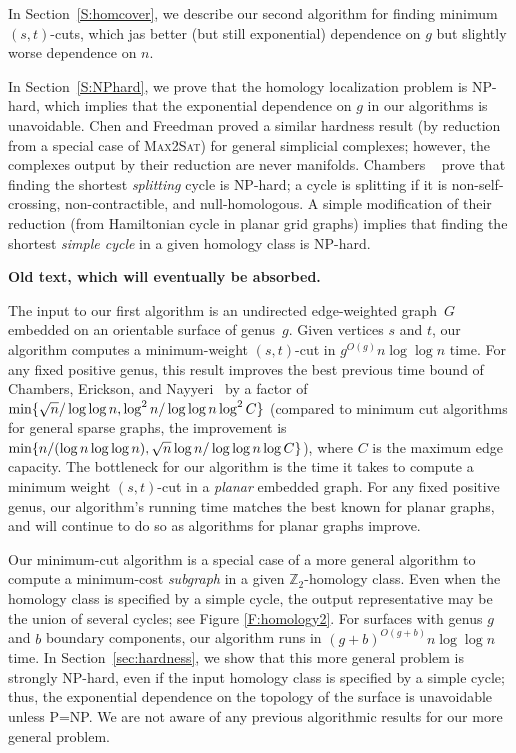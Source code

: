 \documentclass[11pt,twoside]{article}
\def\Z{\mathbb{Z}}
\begin{document}
In Section~\ref{S:homcover}, we describe our second algorithm for finding minimum $(s,t)$-cuts, which jas  better (but still exponential) dependence on $g$ but slightly worse dependence on $n$.  

In Section~\ref{S:NPhard}, we prove that the homology localization problem is NP-hard, which implies that the exponential dependence on $g$ in our algorithms is unavoidable.
Chen and Freedman \cite{cf-qhc-08, cf-qhc2-07} proved a similar hardness result (by reduction from a special case of \textsc{Max2Sat}) for general simplicial complexes; however, the complexes output by their reduction are never manifolds.  Chambers \etal~\cite{ccelw-scsih-08} prove that finding the shortest \emph{splitting} cycle is {NP}-hard; a cycle is splitting if it is non-self-crossing, non-contractible, and null-homologous.  A simple modification of their reduction (from Hamiltonian cycle in planar grid graphs) implies that finding the shortest \emph{simple cycle} in a given homology class is {NP}-hard.  


\color{Purple}
\textbf{\textsf{Old text, which will eventually be absorbed.}}

The input to our first algorithm is an undirected edge-weighted graph~$G$ embedded on an orientable surface of genus~$g$.  Given vertices $s$ and $t$, our algorithm computes a minimum-weight $(s,t)$-cut in $g^{O(g)}n\log \log n$ time.
For any fixed positive genus, this result improves the best previous time bound of Chambers, Erickson, and Nayyeri~\cite{cen-hfcc-12} by a factor of $\min\{  \sqrt{n} / \log \log n, \log^2 n / \log \log n \log^2 C \}$ (compared to minimum cut algorithms for general sparse graphs, the improvement is $\min\{ n / ( \log n \log \log n),\allowbreak
 \sqrt{n} \log n / \log \log n \log C \}$), where $C$ is the maximum edge capacity. 
The bottleneck for our algorithm is the time it takes to compute a minimum weight $(s,t)$-cut in a \emph{planar} embedded graph.
For any fixed positive genus, our algorithm's running time matches the best known for planar graphs, and will continue to do so as algorithms for planar graphs improve.

Our minimum-cut algorithm is a special case of a more general algorithm to compute a minimum-cost \emph{subgraph} in a given $\Z_2$-homology class.  Even when the homology class is specified by a simple cycle, the output representative may be the union of several cycles; see Figure \ref{F:homology2}.  For surfaces with genus $g$ and $b$ boundary components, our algorithm runs in $(g+b)^{O(g+b)}n\log\log n$ time.
In Section~\ref{sec:hardness}, we show that this more general problem is strongly NP-hard, even if the input homology class is specified by a simple cycle; thus, the exponential dependence on the topology of the surface is unavoidable unless {P}={NP}.  We are not aware of any previous algorithmic results for our more general problem.
\end{document}
